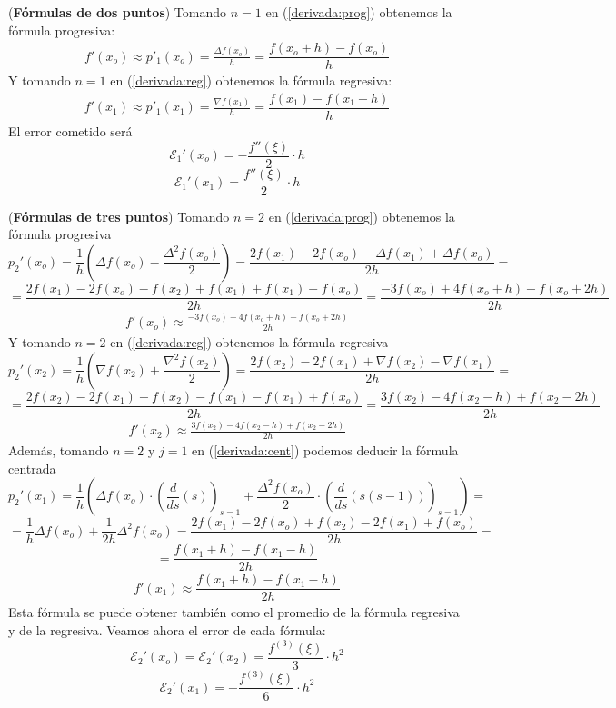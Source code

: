             \begin{ejes}(\textbf{Fórmulas de dos puntos})
            Tomando $n=1$ en (\ref{derivada:prog}) obtenemos la fórmula progresiva:
            \begin{align}                      
            f'(x_o)\approx p'_1(x_o)=\frac{\Delta f(x_o)}{h}=\dfrac{f(x_o+h)-f(x_o)}{h}
            \label{prog:2}
             \end{align}
            Y tomando $n=1$ en (\ref{derivada:reg}) obtenemos la fórmula regresiva:
            \begin{align}
            f'(x_1)\approx p'_1(x_1)=\frac{\nabla f(x_1)}{h}=\dfrac{f(x_1)-f(x_1-h)}{h}
            \label{reg:2}
            \end{align}
            El error cometido será
            $$\mathcal{E}_1'(x_o)=-\dfrac{f''(\xi)}{2}\cdot h$$
            $$\mathcal{E}_1'(x_1)=\dfrac{f''(\xi)}{2}\cdot h$$
            \end{ejes}
            \begin{ejes}
            (\textbf{Fórmulas de tres puntos})
            Tomando $n=2$ en (\ref{derivada:prog}) obtenemos la fórmula progresiva
            $$p_2'(x_o)=\frac{1}{h}\left(\Delta f(x_o)-\frac{\Delta^2f(x_o)}{2}\right)=\frac{2f(x_1)-2f(x_o)-\Delta f(x_1)+\Delta f(x_o)}{2h}=$$
            $$=\frac{2f(x_1)-2f(x_o)-f(x_2)+f(x_1)+f(x_1)- f(x_o)}{2h}=\frac{-3f(x_o)+4f(x_o+h)-f(x_o+2h)}{2h}$$
            \begin{align}
            f'(x_o)\approx\frac{-3f(x_o)+4f(x_o+h)-f(x_o+2h)}{2h}
            \label{prog:3}
            \end{align}
            Y tomando $n=2$ en (\ref{derivada:reg}) obtenemos la fórmula regresiva
            $$p_2'(x_2)=\frac{1}{h}\left(\nabla f(x_2)+\frac{\nabla^2f(x_2)}{2}\right)=\frac{2f(x_2)-2f(x_1)+\nabla f(x_2)-\nabla f(x_1)}{2h}=$$
            $$=\frac{2f(x_2)-2f(x_1)+f(x_2)-f(x_1)-f(x_1)+f(x_o)}{2h}=\frac{3f(x_2)-4f(x_2-h)+f(x_2-2h)}{2h}$$
            \begin{align}
            f'(x_2)\approx \frac{3f(x_2)-4f(x_2-h)+f(x_2-2h)}{2h}
            \label{reg:3}
            \end{align}
            Además, tomando $n=2$ y $j=1$ en (\ref{derivada:cent}) podemos deducir la fórmula centrada
            $$p_2'(x_1)=\frac{1}{h}\left(\Delta f(x_o)\cdot\left(\dfrac{d}{ds} (s)\right)_{s=1}+\dfrac{\Delta^2f(x_o)}{2}\cdot\left(\dfrac{d}{ds}( s(s-1))\right)_{s=1}\right)=$$
            $$=\dfrac{1}{h}\Delta f(x_o)+\dfrac{1}{2h}\Delta^2f(x_o)=\dfrac{2f(x_1)-2f(x_o)+f(x_2)-2f(x_1)+f(x_o)}{2h}=$$
            $$=\dfrac{f(x_1+h)-f(x_1-h)}{2h}$$
            \begin{align}
            f'(x_1)\approx \dfrac{f(x_1+h)-f(x_1-h)}{2h}
            \label{cent:3}
            \end{align}
            Esta fórmula se puede obtener también como el promedio de la fórmula regresiva y de la regresiva. Veamos ahora el error de cada fórmula:
            $$\mathcal{E}_2'(x_o)=\mathcal{E}_2'(x_2)=\dfrac{f^{(3)}(\xi)}{3}\cdot h^2$$
            $$\mathcal{E}_2'(x_1)=-\dfrac{f^{(3)}(\xi)}{6}\cdot h^2$$            
            \end{ejes}
